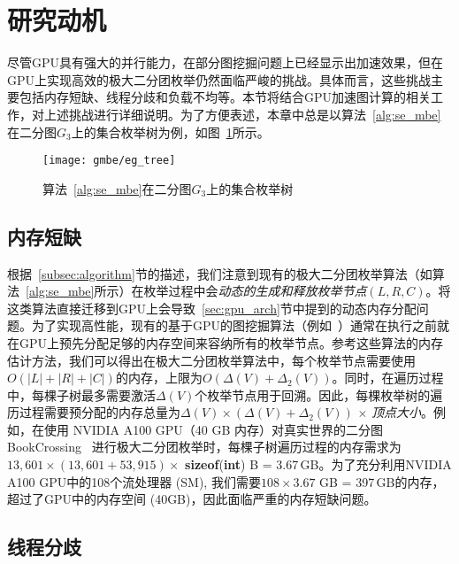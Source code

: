 \section{研究动机}

尽管GPU具有强大的并行能力，在部分图挖掘问题上已经显示出加速效果，但在GPU上实现高效的极大二分团枚举仍然面临严峻的挑战。具体而言，这些挑战主要包括内存短缺、线程分歧和负载不均等。本节将结合GPU加速图计算的相关工作，对上述挑战进行详细说明。为了方便表述，本章中总是以算法~\ref{alg:se_mbe} 在二分图$G_3$上的集合枚举树为例，如图~\ref{fig:gmbe_tree}所示。

\begin{figure} [H]
	\centering
  \vspace{0.1in}
	\texttt{[image: gmbe/eg\_tree]}
  \vspace{0.1in}
	\caption{算法~\ref{alg:se_mbe}在二分图$G_3$上的集合枚举树}

	\label{fig:gmbe_tree}
\end{figure}

\subsection{内存短缺}
根据~\ref{subsec:algorithm}节的描述，我们注意到现有的极大二分团枚举算法（如算法~\ref{alg:se_mbe}所示）在枚举过程中会\emph{动态的生成和释放枚举节点$(L,R,C)$}。将这类算法直接迁移到GPU上会导致~\ref{sec:gpu_arch}节中提到的动态内存分配问题。为了实现高性能，现有的基于GPU的图挖掘算法（例如~\cite{MCE-GPU21,Kclique22,g2miner22,Graphset23}）通常在执行之前就在GPU上预先分配足够的内存空间来容纳所有的枚举节点。参考这些算法的内存估计方法，我们可以得出在极大二分团枚举算法中，每个枚举节点需要使用$O(|L|+|R|+|C|)$的内存，上限为$O(\Delta(V) + \Delta_2(V))$。同时，在遍历过程中，每棵子树最多需要激活$\Delta(V)$个枚举节点用于回溯。因此，每棵枚举树的遍历过程需要预分配的内存总量为$\Delta(V) \times (\Delta(V) + \Delta_2(V))$ $\times$ \textit{顶点大小}。例如，在使用 NVIDIA A100 GPU（40 GB 内存）对真实世界的二分图 BookCrossing~\cite{konect} 进行极大二分团枚举时，每棵子树遍历过程的内存需求为$13,601 \times (13,601 + 53,915) \times$ \textbf{sizeof}(\textbf{int}) B = 3.67\,GB。为了充分利用NVIDIA A100 GPU中的108个流处理器 (SM), 我们需要$108 \times 3.67$ GB = 397\,GB的内存，超过了GPU中的内存空间 (40GB)，因此面临严重的内存短缺问题。

\subsection{线程分歧}
\label{subsec:gmbe_thread_divergence}

